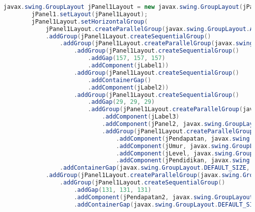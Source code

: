 \begin{lstlisting}[language=Java, caption=TampilanKondisiKetetanggaan.java]
        javax.swing.GroupLayout jPanel1Layout = new javax.swing.GroupLayout(jPanel1);
        jPanel1.setLayout(jPanel1Layout);
        jPanel1Layout.setHorizontalGroup(
            jPanel1Layout.createParallelGroup(javax.swing.GroupLayout.Alignment.LEADING)
            .addGroup(jPanel1Layout.createSequentialGroup()
                .addGroup(jPanel1Layout.createParallelGroup(javax.swing.GroupLayout.Alignment.LEADING)
                    .addGroup(jPanel1Layout.createSequentialGroup()
                        .addGap(157, 157, 157)
                        .addComponent(jLabel1))
                    .addGroup(jPanel1Layout.createSequentialGroup()
                        .addContainerGap()
                        .addComponent(jLabel2))
                    .addGroup(jPanel1Layout.createSequentialGroup()
                        .addGap(29, 29, 29)
                        .addGroup(jPanel1Layout.createParallelGroup(javax.swing.GroupLayout.Alignment.LEADING)
                            .addComponent(jLabel3)
                            .addComponent(jPanel2, javax.swing.GroupLayout.PREFERRED_SIZE, javax.swing.GroupLayout.DEFAULT_SIZE, javax.swing.GroupLayout.PREFERRED_SIZE)
                            .addGroup(jPanel1Layout.createParallelGroup(javax.swing.GroupLayout.Alignment.TRAILING, false)
                                .addComponent(jPendapatan, javax.swing.GroupLayout.Alignment.LEADING, javax.swing.GroupLayout.DEFAULT_SIZE, javax.swing.GroupLayout.DEFAULT_SIZE, Short.MAX_VALUE)
                                .addComponent(jUmur, javax.swing.GroupLayout.Alignment.LEADING, javax.swing.GroupLayout.DEFAULT_SIZE, javax.swing.GroupLayout.DEFAULT_SIZE, Short.MAX_VALUE)
                                .addComponent(jLevel, javax.swing.GroupLayout.Alignment.LEADING, javax.swing.GroupLayout.DEFAULT_SIZE, javax.swing.GroupLayout.DEFAULT_SIZE, Short.MAX_VALUE)
                                .addComponent(jPendidikan, javax.swing.GroupLayout.Alignment.LEADING, javax.swing.GroupLayout.DEFAULT_SIZE, javax.swing.GroupLayout.DEFAULT_SIZE, Short.MAX_VALUE)))))
                .addContainerGap(javax.swing.GroupLayout.DEFAULT_SIZE, Short.MAX_VALUE))
            .addGroup(jPanel1Layout.createParallelGroup(javax.swing.GroupLayout.Alignment.LEADING)
                .addGroup(jPanel1Layout.createSequentialGroup()
                    .addGap(131, 131, 131)
                    .addComponent(jPendapatan2, javax.swing.GroupLayout.PREFERRED_SIZE, javax.swing.GroupLayout.DEFAULT_SIZE, javax.swing.GroupLayout.PREFERRED_SIZE)
                    .addContainerGap(javax.swing.GroupLayout.DEFAULT_SIZE, Short.MAX_VALUE)))

\end{lstlisting}
